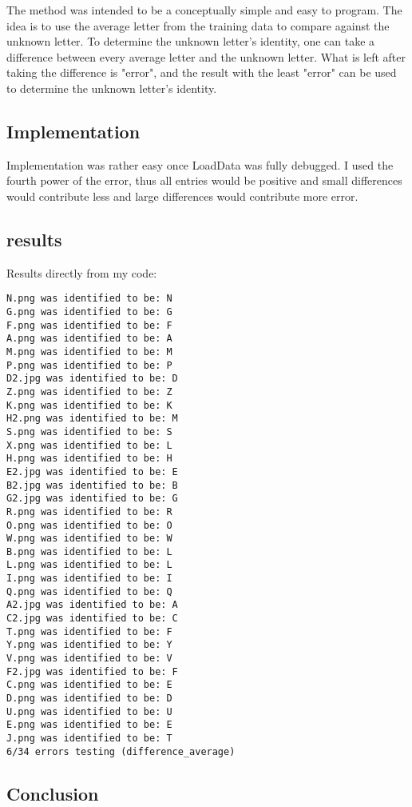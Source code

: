 \documentclass[a4paper]{article}
\begin{document}
The method was intended to be a conceptually simple and easy to program. The idea is to use the average letter from the training data to compare against the unknown letter. To determine the unknown letter's identity, one can take a difference between every average letter and the unknown letter. What is left after taking the difference is "error", and the result with the least "error" can be used to determine the unknown letter's identity.

\subsection{Implementation}

Implementation was rather easy once LoadData was fully debugged. I used the fourth power of the error, thus all entries would be positive and small differences would contribute less and large differences would contribute more error.

\subsection{results}

Results directly from my code:

\begin{verbatim}
N.png was identified to be: N
G.png was identified to be: G
F.png was identified to be: F
A.png was identified to be: A
M.png was identified to be: M
P.png was identified to be: P
D2.jpg was identified to be: D
Z.png was identified to be: Z
K.png was identified to be: K
H2.png was identified to be: M
S.png was identified to be: S
X.png was identified to be: L
H.png was identified to be: H
E2.jpg was identified to be: E
B2.jpg was identified to be: B
G2.jpg was identified to be: G
R.png was identified to be: R
O.png was identified to be: O
W.png was identified to be: W
B.png was identified to be: L
L.png was identified to be: L
I.png was identified to be: I
Q.png was identified to be: Q
A2.jpg was identified to be: A
C2.jpg was identified to be: C
T.png was identified to be: F
Y.png was identified to be: Y
V.png was identified to be: V
F2.jpg was identified to be: F
C.png was identified to be: E
D.png was identified to be: D
U.png was identified to be: U
E.png was identified to be: E
J.png was identified to be: T
6/34 errors testing (difference_average)
\end{verbatim}

\subsection{Conclusion}
\end{document}
